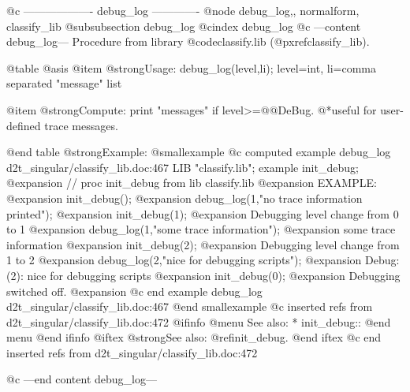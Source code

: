 @c ------------------- debug_log -------------
@node debug_log,, normalform, classify_lib
@subsubsection debug_log
@cindex debug_log
@c ---content debug_log---
Procedure from library @code{classify.lib} (@pxref{classify_lib}).

@table @asis
@item @strong{Usage:}
debug_log(level,li); level=int, li=comma separated "message" list

@item @strong{Compute:}
print "messages" if level>=@@DeBug.
@*useful for user-defined trace messages.

@end table
@strong{Example:}
@smallexample
@c computed example debug_log d2t_singular/classify_lib.doc:467 
LIB "classify.lib";
example init_debug;
@expansion{} // proc init_debug from lib classify.lib
@expansion{} EXAMPLE:
@expansion{}   init_debug();
@expansion{}   debug_log(1,"no trace information printed");
@expansion{}   init_debug(1);
@expansion{} Debugging level change from  0  to  1
@expansion{}   debug_log(1,"some trace information");
@expansion{} some trace information
@expansion{}   init_debug(2);
@expansion{} Debugging level change from  1  to  2
@expansion{}   debug_log(2,"nice for debugging scripts");
@expansion{} Debug:(2):  nice for debugging scripts
@expansion{}   init_debug(0);
@expansion{} Debugging switched off.
@expansion{} 
@c end example debug_log d2t_singular/classify_lib.doc:467
@end smallexample
@c inserted refs from d2t_singular/classify_lib.doc:472
@ifinfo
@menu
See also:
* init_debug::
@end menu
@end ifinfo
@iftex
@strong{See also:}
@ref{init_debug}.
@end iftex
@c end inserted refs from d2t_singular/classify_lib.doc:472

@c ---end content debug_log---
